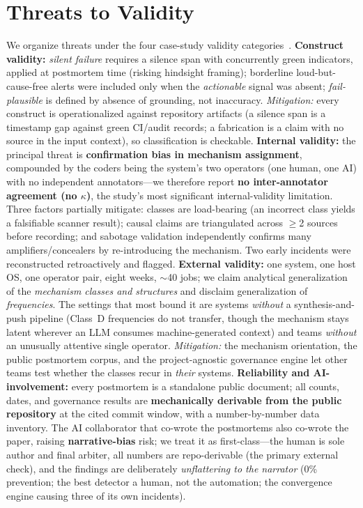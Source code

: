 \documentclass[conference]{IEEEtran}
\begin{document}
\section{Threats to Validity}\label{sec:threats}
We organize threats under the four case-study validity
categories~\cite{runeson2009case}. \textbf{Construct validity:}
\emph{silent failure} requires a silence span with concurrently green
indicators, applied at postmortem time (risking hindsight framing);
borderline loud-but-cause-free alerts were included only when the
\emph{actionable} signal was absent; \emph{fail-plausible} is defined by
absence of grounding, not inaccuracy. \emph{Mitigation:} every construct
is operationalized against repository artifacts (a silence span is a
timestamp gap against green CI/audit records; a fabrication is a claim
with no source in the input context), so classification is checkable.
\textbf{Internal validity:} the principal threat is \textbf{confirmation
bias in mechanism assignment}, compounded by the coders being the system's
two operators (one human, one AI) with no independent annotators---we
therefore report \textbf{no inter-annotator agreement (no $\kappa$)}, the
study's most significant internal-validity limitation. Three factors
partially mitigate: classes are load-bearing (an incorrect class yields a
falsifiable scanner result); causal claims are triangulated across $\geq$2
sources before recording; and sabotage validation independently confirms
many amplifiers/concealers by re-introducing the mechanism. Two early
incidents were reconstructed retroactively and flagged. \textbf{External
validity:} one system, one host OS, one operator pair, eight weeks,
$\sim$40 jobs; we claim analytical generalization of the \emph{mechanism
classes and structures} and disclaim generalization of
\emph{frequencies}. The settings that most bound it are systems
\emph{without} a synthesis-and-push pipeline (Class~D frequencies do not
transfer, though the mechanism stays latent wherever an LLM consumes
machine-generated context) and teams \emph{without} an unusually attentive
single operator. \emph{Mitigation:} the mechanism orientation, the public
postmortem corpus, and the project-agnostic governance engine let other
teams test whether the classes recur in \emph{their} systems.
\textbf{Reliability and AI-involvement:} every postmortem is a standalone
public document; all counts, dates, and governance results are
\textbf{mechanically derivable from the public repository} at the cited
commit window, with a number-by-number data inventory. The AI collaborator
that co-wrote the postmortems also co-wrote the paper, raising
\textbf{narrative-bias} risk; we treat it as first-class---the human is
sole author and final arbiter, all numbers are repo-derivable (the primary
external check), and the findings are deliberately \emph{unflattering to
the narrator} (0\% prevention; the best detector a human, not the
automation; the convergence engine causing three of its own incidents).
\end{document}
